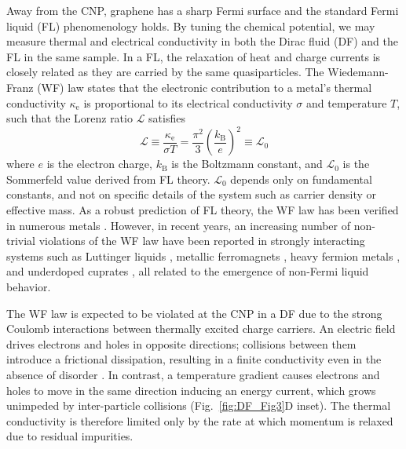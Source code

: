 Away from the CNP, graphene has a sharp Fermi surface and the standard Fermi liquid (FL) phenomenology holds. By tuning the chemical potential, we may measure thermal and electrical conductivity in both the Dirac fluid (DF) and the FL in the same sample. In a FL, the relaxation of heat and charge currents is closely related as they are carried by the same quasiparticles. The Wiedemann-Franz (WF) law \cite{ashcroft_solid_1976} states that the electronic contribution to a metal's thermal conductivity $\kappa_{\mathrm{e}}$ is proportional to its electrical conductivity $\sigma$ and temperature $T$, such that the Lorenz ratio $\mathcal{L}$ satisfies
\begin{equation}
\label{eq:DF_WF}
\mathcal{L}\equiv\frac{\kappa_{\mathrm{e}}}{\sigma T}=\frac{\pi^2}{3}\left(\frac{k_{\mathrm{B}}}{e}\right)^2\equiv\mathcal{L}_0
\end{equation}
where $e$ is the electron charge, $k_{\mathrm{B}}$ is the Boltzmann constant, and $\mathcal{L}_0$ is the Sommerfeld value derived from FL theory. $\mathcal{L}_0$ depends only on fundamental constants, and not on specific details of the system such as carrier density or effective mass. As a robust prediction of FL theory, the WF law has been verified in numerous metals \cite{ashcroft_solid_1976}. However, in recent years, an increasing number of non-trivial violations of the WF law have been reported in strongly interacting systems such as Luttinger liquids \cite{wakeham_gross_2011}, metallic ferromagnets \cite{smith_marginal_2008}, heavy fermion metals \cite{pfau_thermal_2012}, and underdoped cuprates \cite{hill_breakdown_2001}, all related to the emergence of non-Fermi liquid behavior.

The WF law is expected to be violated at the CNP in a DF due to the strong Coulomb interactions between thermally excited charge carriers. An electric field drives electrons and holes in opposite directions; collisions between them introduce a frictional dissipation, resulting in a finite conductivity even in the absence of disorder \cite{fritz_quantum_2008}. In contrast, a temperature gradient causes electrons and holes to move in the same direction inducing an energy current, which grows unimpeded by inter-particle collisions (Fig.~\ref{fig:DF_Fig3}D inset). The thermal conductivity is therefore limited only by the rate at which momentum is relaxed due to residual impurities.

